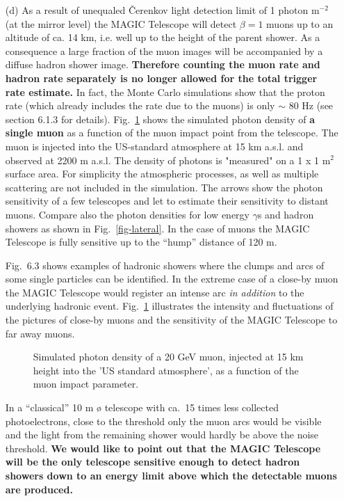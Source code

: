 \begin{itemize}
\item[(d)]  As a result of unequaled \v{C}erenkov light detection 
limit of 1 photon m$^{-2}
$ (at the mirror level) the MAGIC Telescope will detect $\beta =1$ muons up to an
altitude of ca. 14 km, i.e. well up to the height of the parent shower. As a
consequence a large fraction of the muon images will be accompanied by a
diffuse hadron shower image. {\bf Therefore counting the muon rate and hadron
rate separately is no longer allowed for the total trigger rate estimate.}
In fact, the
Monte Carlo simulations show that the proton rate
(which already includes the rate due to the muons) is only $\sim$ 80 Hz
(see section 6.1.3 for details).
Fig.~\ref{fig-impact} shows the simulated
\Cerenkov photon density of {\bf a single muon}
as a
function of the muon impact point from the telescope. 
The muon is injected into the US-standard atmosphere at 15 km a.s.l. and
observed at 2200 m a.s.l. The density of \Cerenkov photons is
"measured" on a 1 x 1 m$^2$ surface area. For simplicity the atmospheric
processes, as well as multiple scattering are not included in the
simulation.
The arrows show the photon sensitivity of a few telescopes and let
to estimate their sensitivity to distant muons.
Compare also the
\Cerenkov photon densities for low energy $\gamma$s and hadron showers
as shown in Fig.~\ref{fig-lateral}.
In the case of muons the MAGIC Telescope is
fully sensitive up to the ``hump'' distance of 120 m.

Fig.~6.3 shows examples of hadronic showers where the clumps and arcs
of some single particles can be identified. In the extreme case
of a close-by muon the MAGIC Telescope would register an intense arc {\sl in addition}
to the underlying hadronic event. 
Fig.~\ref{fig-impact} illustrates the intensity and fluctuations of the pictures
of close-by muons and the sensitivity of the MAGIC Telescope
to far away muons.


\begin{figure}[htb] \centering \leavevmode
\epsfxsize=13cm
\caption{Simulated \Cerenkov photon density of a 20 GeV muon,
injected  at 15 km height into the 'US standard atmosphere', 
as a function of the muon impact
parameter.}
\label{fig-impact}
\end{figure}

In a ``classical'' 10 m {\o} telescope with ca.\, 15 times less collected
photoelectrons, close to the threshold only the muon arcs would 
be visible
and the light from the
remaining shower would hardly be above the noise threshold.
{\bf We would like to
point out that the MAGIC Telescope will be the only telescope 
sensitive enough to detect hadron
showers down to an energy limit above which the detectable muons are produced.}


\end{itemize}
